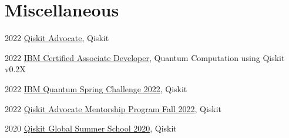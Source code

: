 \documentclass[10pt]{extreport}
\begin{document}
\section*{Miscellaneous}

\begin{tablist}
	\item[2022]  \tab{} \href{https://www.credly.com/badges/1572414f-9c43-4bab-909b-be4abf516ae3/public_url}{Qiskit Advocate}, Qiskit
	\item[2022]  \tab{} \href{https://www.credly.com/badges/055e900b-ec8b-428c-b0aa-854695b17bef/public_url}{IBM Certified Associate Developer}, Quantum Computation using Qiskit v0.2X
	\item[2022]  \tab{} \href{https://www.credly.com/badges/ca639522-d9e4-412d-be79-95c3a0819c29/public_url}{IBM Quantum Spring Challenge 2022}, Qiskit
	\item[2022]  \tab{} \href{https://www.credly.com/badges/42753d82-8fcc-4f50-8068-c30cd510c286/public_url}{Qiskit Advocate
		Mentorship Program Fall 2022}, Qiskit
	\item[2020]  \tab{}
	\href{https://www.credly.com/badges/1572414f-9c43-4bab-909b-be4abf516ae3/public_url}{Qiskit
		Global Summer School 2020}, Qiskit
\end{tablist}
\end{document}
